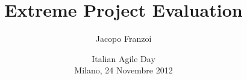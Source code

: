 \documentclass[compress, red]{beamer}
\title{ Extreme Project Evaluation }
\author{
	Jacopo Franzoi
}
\institute{
	jacopo.franzoi@gmail.com
}
\date{
	Italian Agile Day \\
	Milano, 24 Novembre 2012
}
\begin{document}
\frame{
	\titlepage
}

\end{document}
